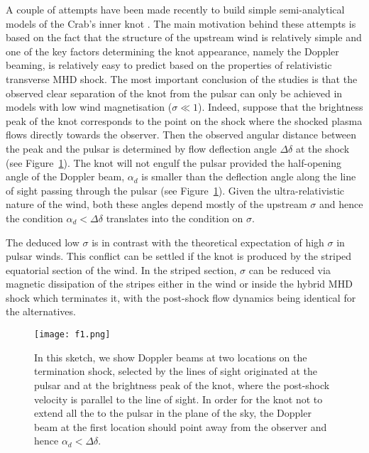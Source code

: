 A couple of attempts have been made recently to build simple semi-analytical models of the Crab’s inner knot \citep{YB-15,LKP-16}. The main motivation behind these attempts is based on the fact that the structure of the upstream wind is relatively simple and one of the key factors determining the knot appearance, namely the Doppler beaming, is relatively easy to predict based on the properties of relativistic transverse MHD shock.  The most important conclusion of the studies is that the observed clear separation of the knot from the pulsar can only be achieved in models with low wind magnetisation ($\sigma \ll 1$).   
Indeed, suppose that the brightness peak of the knot corresponds to the point on the shock where the shocked plasma 
flows directly towards the observer. Then the observed angular distance between the peak and the pulsar is determined 
by flow deflection angle $\Delta\delta$ at the shock (see Figure~\ref{knot-separation}). The knot will not engulf the pulsar provided the half-opening angle of the Doppler beam, $\alpha_d$ is smaller than the deflection angle along the line of sight passing through the pulsar (see Figure~\ref{knot-separation}). Given the ultra-relativistic nature of the wind, both these angles depend mostly of the upstream $\sigma$ and hence the condition $\alpha_d < \Delta\delta$ translates into the condition on $\sigma$.    

The deduced low $\sigma$ is in contrast with the theoretical expectation of high $\sigma$ in pulsar winds. This conflict can be settled if the knot is produced by the striped equatorial section of the wind. In the striped section, $\sigma$ can be reduced via
magnetic dissipation of the stripes either in the wind or inside the hybrid MHD shock which terminates it, with the post-shock flow dynamics being identical for the alternatives.  


\begin{figure}[h!]
\begin{center}
\texttt{[image: f1.png]}
\caption{In this sketch, we show Doppler beams at two locations on the termination shock, selected by the lines of sight originated at the pulsar and  at the brightness peak of the knot, where the post-shock velocity is parallel to the line of sight.  
In order for the knot not to extend all the to the pulsar in the plane of the sky,  the Doppler beam at the first location should point away from the observer and hence $\alpha_d < \Delta\delta$.  
}
\end{center}
\label{knot-separation}
\end{figure}

